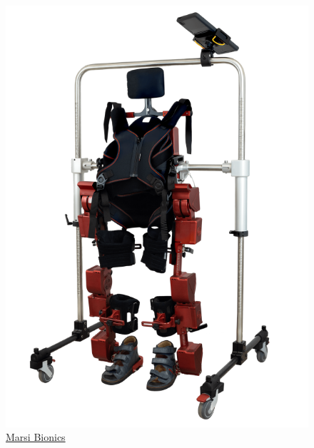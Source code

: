 \begin{figure}[ht!]
\begin{minipage}{0.2\linewidth}
    	\centering
    	\includegraphics[width=\linewidth]{figs/marsi.png}
    	\caption*{\centering\href{https://www.marsibionics.com/}{Marsi Bionics} }
    \end{minipage}
    \hspace{3cm}
    \begin{minipage}{0.25\linewidth}
    	\centering

\end{minipage}
\end{figure}
